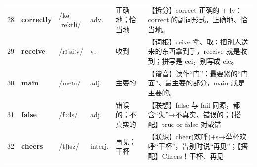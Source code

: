 \documentclass[UTF8,a4paper,11pt,oneside]{ctexbook}
\newcommand{\cellword}[1]{{\bfseries\textcolor{wordcol}{#1}}}
\newcommand{\cellipa}[1]{{\footnotesize\textcolor{ipacol}{#1}}}
\newcommand{\cellpos}[1]{\textcolor{poscol}{#1}}
\newcommand{\cellno}[1]{\textcolor{volcolor!75!black}{#1}}
\begin{document}
{\begin{longtable}{@{}C{0.045\textwidth}L{0.155\textwidth}L{0.175\textwidth}C{0.070\textwidth}L{0.180\textwidth}L{0.282\textwidth}@{}}
\cellno{28} & \cellword{correctly} & \cellipa{/kəˈrektli/} & \cellpos{adv.} & 正确地；恰当地 & \textcolor{tagSplit}{【拆分】}correct 正确的 + ly：correct 的副词形式，正确地、恰当地。 \\
 \cellno{29} & \cellword{receive} & \cellipa{/rɪˈsiːv/} & \cellpos{v.} & 收到 & \textcolor{tagRoot}{【词根】}ceive 拿、取：把别人送来的东西拿到手，receive 就是收到；拼写是 cei，别写成 cie。 \\
\cellno{30} & \cellword{main} & \cellipa{/meɪn/} & \cellpos{adj.} & 主要的 & \textcolor{tagSound}{【谐音】}读作“门”：最要紧的“门面”、最主要的部分，main 就是主要的。 \\
 \cellno{31} & \cellword{false} & \cellipa{/fɔːls/} & \cellpos{adj.} & 错误的；不真实的 & \textcolor{tagAssoc}{【联想】}false 与 fail 同源，都含“失”→\allowbreak{}不真实、错误的；\textcolor{tagColloc}{【搭配】}true or false 对或错 \\
\cellno{32} & \cellword{cheers} & \cellipa{/tʃɪəz/} & \cellpos{interj.} & 再见；干杯 & \textcolor{tagAssoc}{【联想】}cheer(欢呼)+s→\allowbreak{}举杯欢呼“干杯”，告别时说“再见”；\textcolor{tagColloc}{【搭配】}Cheers！干杯、再见 \\
\end{longtable}
}

\end{document}
